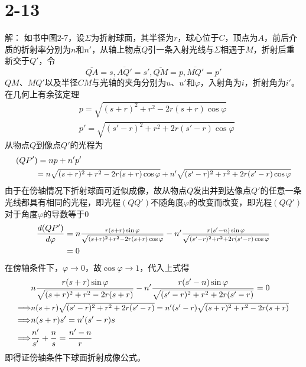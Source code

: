 \documentclass[10pt,a4paper]{article}
\theoremstyle{remark}
\begin{document}
\section*{2-13}解：
如书中图2-7，设$\Sigma$为折射球面，其半径为$r$，球心位于$C$，顶点为$A$，前后介质的折射率分别为$n$和$n'$，从轴上物点$Q$引一条入射光线与$\Sigma$相遇于$M$，折射后重新交于$Q'$，令
\[
\overline{QA} = s, \overline{AQ'} = s', \overline{QM} = p, \overline{MQ'} = p'
\]
$QM$、$MQ'$以及半径$CM$与光轴的夹角分别为$u$、$u'$和$\varphi$，入射角为$i$，折射角为$i'$。在几何上有余弦定理
\begin{align*}
&p = \sqrt{(s + r)^2 + r^2 - 2r(s + r)\cos\varphi}\\
&p' = \sqrt{(s' - r)^2 + r^2 + 2r(s' - r)\cos\varphi}
\end{align*}
从物点$Q$到像点$Q'$的光程为
\begin{align*}
(QP') &= np + n'p'\\
&\scalebox{0.95}{$= n\sqrt{(s + r)^2 + r^2 - 2r(s + r)\cos\varphi} + n'\sqrt{(s' - r)^2 + r^2 + 2r(s' - r)\cos\varphi}$}
\end{align*}
由于在傍轴情况下折射球面可近似成像，故从物点$Q$发出并到达像点$Q'$的任意一条光线都具有相同的光程，即光程$(QQ')$不随角度$\varphi$的改变而改变，即光程$(QQ')$对于角度$\varphi$的导数等于$0$
\begin{align*}
\frac{d(QP')}{d\varphi} &=  \scalebox{1}{$n\frac{r(s + r)\sin\varphi}{\sqrt{(s + r)^2 + r^2 - 2r(s + r)\cos\varphi}} - n'\frac{r(s' - n)\sin\varphi}{\sqrt{(s' - r)^2 + r^2 + 2r(s' - r)\cos\varphi}}$}\\
&= 0
\end{align*}
在傍轴条件下，$\varphi\to0$，故$\cos\varphi\to1$，代入上式得
\begin{align*}
&n\frac{r(s + r)\sin\varphi}{\sqrt{(s + r)^2 + r^2 - 2r(s + r)}} - n'\frac{r(s' - n)\sin\varphi}{\sqrt{(s' - r)^2 + r^2 + 2r(s' - r)}} = 0\\
\Longrightarrow&\scalebox{0.95}{$n(s + r)\sqrt{(s' - r)^2 + r^2 + 2r(s' - r)} = n'(s' - r)\sqrt{(s + r)^2 + r^2 - 2r(s + r)}$}\\
\Longrightarrow&n(s + r)s' = n'(s' - r)s\\
\Longrightarrow&\frac{n'}{s'} + \frac{n}{s} = \frac{n' - n}{r}
\end{align*}
即得证傍轴条件下球面折射成像公式。
\end{document}

